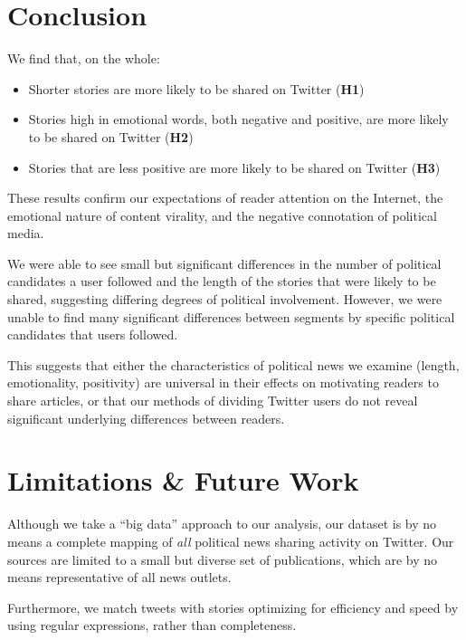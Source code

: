 \documentclass[letterpaper]{article}
\begin{document}
\section{Conclusion}

We find that, on the whole:
\begin{itemize}
    \item Shorter stories are more likely to be shared on Twitter (\textbf{H1})
    \item Stories high in emotional words, both negative and positive, are more likely to be shared on Twitter (\textbf{H2})
    \item Stories that are less positive are more likely to be shared on Twitter (\textbf{H3})
\end{itemize}

These results confirm our expectations of reader attention on the Internet, the emotional nature of content virality, and the negative connotation of political media. 

We were able to see small but significant differences in the number of political candidates a user followed and the length of the stories that were likely to be shared, suggesting differing degrees of political involvement. However, we were unable to find many significant differences between segments by specific political candidates that users followed. 

This suggests that either the characteristics of political news we examine (length, emotionality, positivity) are universal in their effects on motivating readers to share articles, or that our methods of dividing Twitter users do not reveal significant underlying differences between readers.


\section{Limitations \& Future Work}
Although we take a ``big data'' approach to our analysis, our dataset is by no means a complete mapping of \emph{all} political news sharing activity on Twitter. Our sources are limited to a small but diverse set of publications, which are by no means representative of all news outlets.

Furthermore, we match tweets with stories optimizing for efficiency and speed by using regular expressions, rather than completeness.
\end{document}
